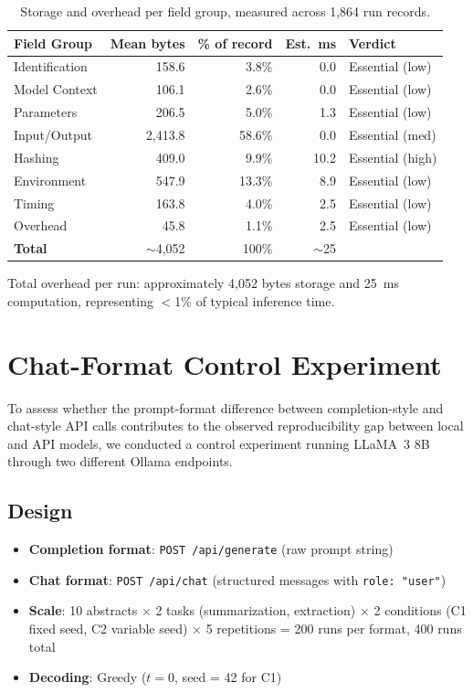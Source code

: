\documentclass[11pt]{article}
\begin{document}
\begin{table}[H]
\centering
\caption{Storage and overhead per field group, measured across 1,864 run records.}
\label{tab:overhead}
\small
\begin{tabular}{@{}lrrrl@{}}
\toprule
\textbf{Field Group} & \textbf{Mean bytes} & \textbf{\% of record} & \textbf{Est.\ ms} & \textbf{Verdict} \\
\midrule
Identification  & 158.6 & 3.8\% & 0.0 & Essential (low) \\
Model Context   & 106.1 & 2.6\% & 0.0 & Essential (low) \\
Parameters      & 206.5 & 5.0\% & 1.3 & Essential (low) \\
Input/Output    & 2,413.8 & 58.6\% & 0.0 & Essential (med) \\
Hashing         & 409.0 & 9.9\% & 10.2 & Essential (high) \\
Environment     & 547.9 & 13.3\% & 8.9 & Essential (low) \\
Timing          & 163.8 & 4.0\% & 2.5 & Essential (low) \\
Overhead        & 45.8 & 1.1\% & 2.5 & Essential (low) \\
\midrule
\textbf{Total}  & $\sim$4,052 & 100\% & $\sim$25 & \\
\bottomrule
\end{tabular}
\par\smallskip\raggedright\footnotesize
Total overhead per run: approximately 4,052 bytes storage and 25~ms computation, representing $<$1\% of typical inference time.
\end{table}


\section{Chat-Format Control Experiment}
\label{sec:s7}

To assess whether the prompt-format difference between completion-style and chat-style API calls contributes to the observed reproducibility gap between local and API models, we conducted a control experiment running LLaMA~3 8B through two different Ollama endpoints.

\subsection{Design}

\begin{itemize}[noitemsep]
    \item \textbf{Completion format}: \texttt{POST /api/generate} (raw prompt string)
    \item \textbf{Chat format}: \texttt{POST /api/chat} (structured messages with \texttt{role: "user"})
    \item \textbf{Scale}: 10 abstracts $\times$ 2 tasks (summarization, extraction) $\times$ 2 conditions (C1 fixed seed, C2 variable seed) $\times$ 5 repetitions = 200 runs per format, 400 runs total
    \item \textbf{Decoding}: Greedy ($t = 0$, seed = 42 for C1)
\end{itemize}
\end{document}

